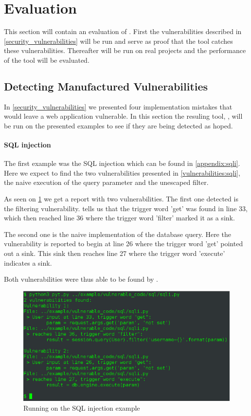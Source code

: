 \section{Evaluation}
This section will contain an evaluation of \pyt{}.
First the vulnerabilities described in \cref{security_vulnerabilities} will be run and serve as proof that the tool catches these vulnerabilities.
Thereafter \pyt{} will be run on real projects and the performance of the tool will be evaluated.

\subsection{Detecting Manufactured Vulnerabilities}
In \cref{security_vulnerabilities} we presented four implementation mistakes that would leave a web application vulnerable.
In this section the resuling tool, \pyt{}, will be run on the presented examples to see if they are being detected as hoped.

\paragraph{SQL injection}
The first example was the SQL injection which can be found in \cref{appendix:sqli}.
Here we expect to find the two vulnerabilities presented in \cref{vulnerabilities:sqli}, the naive execution of the query parameter and the unescaped filter.

As seen on \cref{sqli:console} we get a report with two vulnerabilities.
The first one detected is the filtering vulnerability.
\pyt{} tells us that the trigger word 'get' was found in line 33, which then reached line 36 where the trigger word 'filter' marked it as a sink.

The second one is the naive implementation of the database query.
Here the vulnerability is reported to begin at line 26 where the trigger word 'get' pointed out a sink.
This sink then reaches line 27 where the trigger word 'execute' indicates a sink.

Both vulnerabilities were thus able to be found by \pyt{}.

\begin{figure}
  \includegraphics[width=\textwidth]{./figures/sqli_console.png}
  \caption{Running \pyt{} on the SQL injection example}
  \label{sqli:console}
\end{figure}

